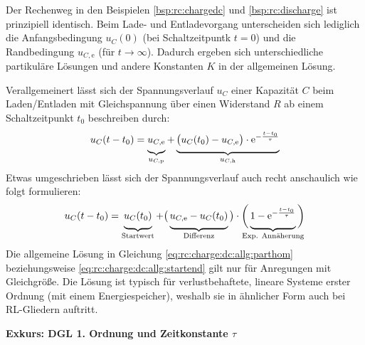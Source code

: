 \begin{frame}[t]
{    Der Rechenweg in den Beispielen \ref{bsp:rc:chargedc} und \ref{bsp:rc:discharge} ist prinzipiell identisch.
    Beim Lade- und Entladevorgang unterscheiden sich lediglich die Anfangsbedingung $u_C(0)$ (bei Schaltzeitpuntk $t=0$) und die Randbedingung $u_{C,\mathrm{e}}$ (für $t \to \infty$).
    Dadurch ergeben sich unterschiedliche partikuläre Lösungen und andere Konstanten $K$ in der allgemeinen Lösung.

    Verallgemeinert lässt sich der Spannungsverlauf $u_C$ einer Kapazität $C$ beim Laden/Entladen mit Gleichspannung über einen Widerstand $R$
    ab einem Schaltzeitpunkt $t_0$ beschreiben durch:
    \begin{equation}\label{eq:rc:charge:dc:allg:parthom}
        u_C(t-t_0) = \underbrace{ u_{C,\mathrm{e}} \vphantom{\Big|}}_{u_{C,\mathrm{p}}} + \underbrace{ \big(u_C(t_0)-u_{C,\mathrm e}\big) \cdot  \mathrm{e}^{-\frac{t-t_0}{\tau}} \vphantom{\Big|}}_{u_{C,\mathrm{h}}}
    \end{equation}
    Etwas umgeschrieben lässt sich der Spannungsverlauf auch recht anschaulich wie folgt formulieren:
    \begin{equation}\label{eq:rc:charge:dc:allg:startend}
        u_C(t-t_0) = \underbrace{u_C(t_0) \vphantom{\Big|}}_{\text{Startwert}} + \big(\underbrace{u_{C,\mathrm e} - u_C(t_0) \vphantom{\Big|}}_{\text{Differenz}}\big) \cdot \bigg( \underbrace{ 1- \mathrm{e}^{-\frac{t-t_0}{\tau}} \vphantom{\Big|}}_{\text{\clap{Exp. Annäherung}}} \bigg)
    \end{equation}
    Die allgemeine Lösung in Gleichung \ref{eq:rc:charge:dc:allg:parthom} beziehungsweise \ref{eq:rc:charge:dc:allg:startend} gilt nur für Anregungen mit Gleichgröße.
    Die Lösung ist typisch für verlustbehaftete, lineare Systeme erster Ordnung (mit einem Energiespeicher), weshalb sie in ähnlicher Form auch bei RL-Gliedern auftritt.

    \textbf{Exkurs: DGL 1. Ordnung und Zeitkonstante $\tau$}

}
\end{frame}

